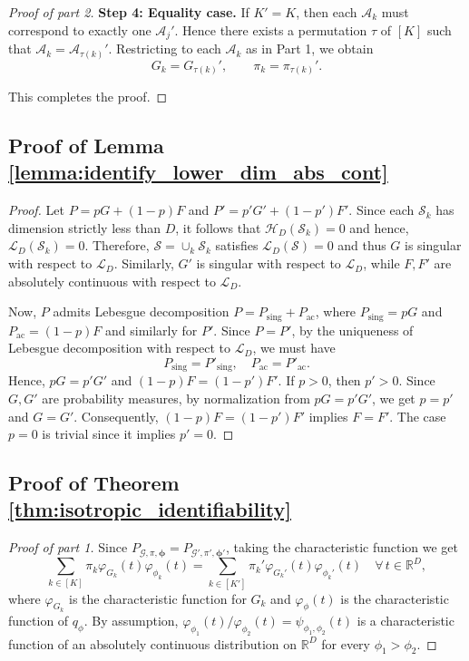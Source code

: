 \documentclass[bj,authoryear]{imsart}
\theoremstyle{plain}
\theoremstyle{remark}
\def\bphi{{\boldsymbol\phi}}
\def\bbR{\mathbb{R}}
\def\cA{\mathcal{A}}
\def\cG{\mathcal{G}}
\def\cH{\mathcal{H}}
\def\cL{\mathcal{L}}
\def\cS{\mathcal{S}}
\begin{document}
\begin{appendix}
\begin{proof}[Proof of part 2]
\medskip

\noindent
\textbf{Step 4: Equality case.}
If $K'=K$, then each $\cA_k$ must correspond to exactly one $\cA_j'$. Hence there exists a permutation $\tau$ of $[K]$ such that $\cA_k = \cA_{\tau(k)}'$. Restricting to each $\cA_k$ as in Part 1, we obtain
\[
G_k = G_{\tau(k)}', \qquad \pi_k = \pi_{\tau(k)}'.
\]

This completes the proof.
\end{proof}

\subsection{Proof of Lemma \ref{lemma:identify_lower_dim_abs_cont}}
\begin{proof}
    Let $P=pG + (1-p)F$ and $P'=p'G'+(1-p')F'$. Since each $\cS_k$ has dimension strictly less than $D$, it follows that $\cH_D(\cS_k)=0$ and hence, $\cL_D(\cS_k)=0$. Therefore, $\cS=\cup_k \cS_k$ satisfies $\cL_D(\cS)=0$ and thus $G$ is singular with respect to $\cL_D$. Similarly, $G'$ is singular with respect to $\cL_D$, while $F, F'$ are absolutely continuous with respect to $\cL_D$.

    Now, $P$ admits Lebesgue decomposition $P=P_{\text{sing}}+P_{\text{ac}}$, where $P_{\text{sing}}=pG$ and $P_{\text{ac}}=(1-p)F$ and similarly for $P'$. Since $P=P'$, by the uniqueness of Lebesgue decomposition with respect to $\cL_D$, we must have
    $$P_{\text{sing}}=P'_{\text{sing}}, \quad P_{\text{ac}}=P'_{\text{ac}}.$$
    Hence, $pG=p'G'$ and $(1-p)F=(1-p')F'$. If $p>0$, then $p'>0$. Since $G, G'$ are probability measures, by normalization from $pG=p'G'$, we get $p=p'$ and $G=G'$. Consequently, $(1-p)F=(1-p')F'$ implies $F=F'$. The case $p=0$ is trivial since it implies $p'=0$.
\end{proof}

\subsection{Proof of Theorem \ref{thm:isotropic_identifiability}}
\label{app:proof_thm:isotropic_identifiability}
\begin{proof}[Proof of part 1]
    Since $P_{\cG,\pi,\bphi} = P_{\cG',\pi',\bphi'}$, taking the characteristic function we get 
     $$\sum_{k\in[K]} \pi_k \varphi_{G_k}(t)\varphi_{\phi_k}(t) = \sum_{k\in[K']} \pi_k' \varphi_{G_k'}(t)\varphi_{\phi_k'}(t)\quad \forall\, t\in\bbR^D,$$
     where $\varphi_{G_k}$ is the characteristic function for $G_k$ and $\varphi_{\phi}(t)$ is the characteristic function of $q_{\phi}$. By assumption, $\varphi_{\phi_1}(t)/\varphi_{\phi_2}(t)=\psi_{\phi_1,\phi_2}(t)$ is a characteristic function of an absolutely continuous distribution on $\bbR^D$ for every $\phi_1>\phi_2$.
     

\end{proof}
\end{appendix}
\end{document}
